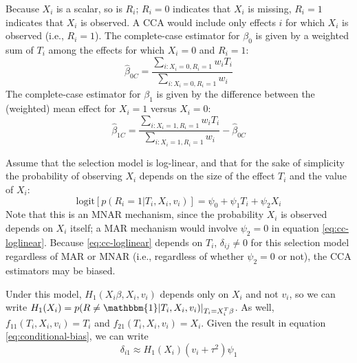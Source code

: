 \documentclass[
]{article}
\begin{document}
Because \(X_i\) is a scalar, so is \(R_i\); \(R_i = 0\) indicates that \(X_i\) is missing, \(R_i = 1\) indicates that \(X_i\) is observed.
A CCA would include only effects \(i\) for which \(X_i\) is observed (i.e., \(R_i = 1\)).
The complete-case estimator for \(\beta_0\) is given by a weighted sum of \(T_i\) among the effects for which \(X_i = 0\) and \(R_i = 1\):
\begin{equation}
\hat{\beta}_{0C} = \frac{\sum_{i: X_i = 0, R_i = 1} w_i T_i}{\sum_{i: X_i = 0, R_i = 1} w_i}
\label{eq:b0c-ex}
\end{equation}
The complete-case estimator for \(\beta_1\) is given by the difference between the (weighted) mean effect for \(X_i = 1\) versus \(X_i = 0\):
\begin{equation}
\hat{\beta}_{1C} = \frac{\sum_{i: X_i = 1, R_i = 1} w_i T_i}{\sum_{i: X_i = 1, R_i = 1} w_i} - \hat{\beta}_{0C}
\label{eq:b1c-ex}
\end{equation}

Assume that the selection model is log-linear, and that for the sake of simplicity the probability of observing \(X_i\) depends on the size of the effect \(T_i\) and the value of \(X_i\):
\begin{equation}
\text{logit}[p(R_i = 1 | T_i, X_i, v_i)] 
  = \psi_0  + \psi_1 T_i + \psi_2 X_i
\label{eq:cc-loglinear}
\end{equation}
Note that this is an MNAR mechanism, since the probability \(X_i\) is observed depends on \(X_i\) itself; a MAR mechanism would involve \(\psi_2 = 0\) in equation \eqref{eq:cc-loglinear}.
Because \eqref{eq:cc-loglinear} depends on \(T_i\), \(\delta_{ij} \neq 0\) for this selection model regardless of MAR or MNAR (i.e., regardless of whether \(\psi_2 = 0\) or not), the CCA estimators may be biased.

Under this model, \(H_{1}(X_i\beta, X_i, v_i)\) depends only on \(X_i\) and not \(v_i\), so we can write \(H_1(X_i) = p(R \neq \mathbbm{1} | T_i, X_i, v_i)\rvert_{T_i = X_i^T \beta}\).
As well, \(f_{11}(T_i, X_i, v_i) = T_i\) and \(f_{21}(T_i, X_i, v_i) = X_i\).
Given the result in equation \eqref{eq:conditional-bias}, we can write
\begin{equation}
\delta_{i1}
   \approx H_1(X_i)(v_i + \tau^2)\psi_1
\label{eq:cc-ex-delta}
\end{equation}
\end{document}
